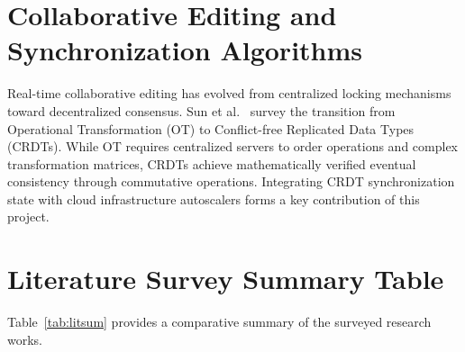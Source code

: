 \documentclass[12pt,a4paper]{report}
\begin{document}
	\section{Collaborative Editing and Synchronization Algorithms}
	Real-time collaborative editing has evolved from centralized locking mechanisms toward decentralized consensus. Sun et al.~\cite{crdtsurvey} survey the transition from Operational Transformation (OT) to Conflict-free Replicated Data Types (CRDTs). While OT requires centralized servers to order operations and complex transformation matrices, CRDTs achieve mathematically verified eventual consistency through commutative operations. Integrating CRDT synchronization state with cloud infrastructure autoscalers forms a key contribution of this project.
	
	\clearpage
	\section{Literature Survey Summary Table}
	Table~\ref{tab:litsum} provides a comparative summary of the surveyed research works.
	
\end{document}

